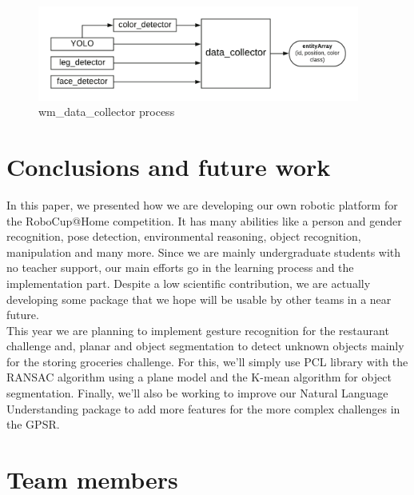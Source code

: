 \documentclass[runningheads,a4paper]{llncs}
\begin{document}
\begin{figure}
  \centering
  \includegraphics[width=300pt]{images/wm_data_collector.png}
  \caption{ wm\_data\_collector process}
\end{figure} 


\section{Conclusions and future work} 
\tab In this paper, we presented how we are developing our own robotic platform for the RoboCup@Home competition. It has many abilities like a person and gender recognition, pose detection, environmental reasoning, object recognition, manipulation and many more. Since we are mainly undergraduate students with no teacher support, our main efforts go in the learning process and the implementation part. Despite a low scientific contribution, we are actually developing some package that we hope will be usable by other teams in a near future.\\

This year we are planning to implement gesture recognition for the restaurant challenge and, planar and object segmentation to detect unknown objects mainly for the storing groceries challenge. For this, we'll simply use PCL library with the RANSAC algorithm using a plane model and the K-mean algorithm for object segmentation. Finally, we'll also be working to improve our Natural Language Understanding package to add more features for the more complex challenges in the GPSR.\\ 

\nocite{*}




	
\section*{Team members}
\end{document}
